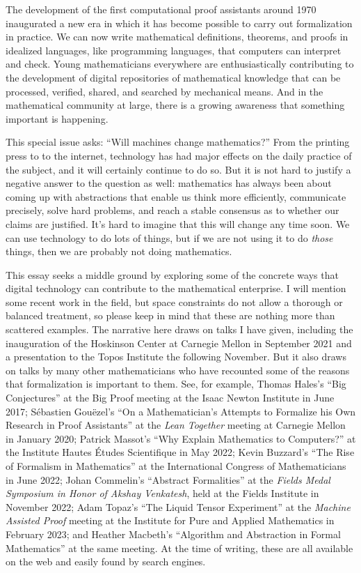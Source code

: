 \documentclass{amsart}
\theoremstyle{definition}
\theoremstyle{remark}
\numberwithin{equation}{section}
\begin{document}
The development of the first computational proof assistants around 1970 inaugurated a new era in which it has become possible to carry out formalization in practice. We can now write mathematical definitions, theorems, and proofs in idealized languages, like programming languages, that computers can interpret and check. Young mathematicians everywhere are enthusiastically contributing to the development of digital repositories of mathematical knowledge that can be processed, verified, shared, and searched by mechanical means. And in the mathematical community at large, there is a growing awareness that something important is happening.

This special issue asks: ``Will machines change mathematics?'' From the printing press to to the internet, technology has had major effects on the daily practice of the subject, and it will certainly continue to do so. But it is not hard to justify a negative answer to the question as well: mathematics has always been about coming up with abstractions that enable us think more efficiently, communicate precisely, solve hard problems, and reach a stable consensus as to whether our claims are justified. It's hard to imagine that this will change any time soon. We can use technology to do lots of things, but if we are not using it to do \emph{those} things, then we are probably not doing mathematics.

This essay seeks a middle ground by exploring some of the concrete ways that digital technology can contribute to the mathematical enterprise. I will mention some recent work in the field, but space constraints do not allow a thorough or balanced treatment, so please keep in mind that these are nothing more than scattered examples. The narrative here draws on talks I have given, including the inauguration of the Hoskinson Center at Carnegie Mellon in September 2021 and a presentation to the Topos Institute the following November. But it also draws on talks by many other mathematicians who have recounted some of the reasons that formalization is important to them. See, for example, Thomas Hales's ``Big Conjectures'' at the Big Proof meeting at the Isaac Newton Institute in June 2017; S\'ebastien Gou\"ezel's ``On a Mathematician's Attempts to Formalize his Own Research in Proof Assistants'' at the \emph{Lean Together} meeting at Carnegie Mellon in January 2020; Patrick Massot's ``Why Explain Mathematics to Computers?'' at the Institute Hautes \'Etudes Scientifique in May 2022; Kevin Buzzard's ``The Rise of Formalism in Mathematics'' at the International Congress of Mathematicians in June 2022; Johan Commelin's ``Abstract Formalities'' at the \emph{Fields Medal Symposium in Honor of Akshay Venkatesh}, held at the Fields Institute in November 2022; Adam Topaz's ``The Liquid Tensor Experiment'' at the \emph{Machine Assisted Proof} meeting at the Institute for Pure and Applied Mathematics in February 2023; and Heather Macbeth's ``Algorithm and Abstraction in Formal Mathematics'' at the same meeting. At the time of writing, these are all available on the web and easily found by search engines.
\end{document}
